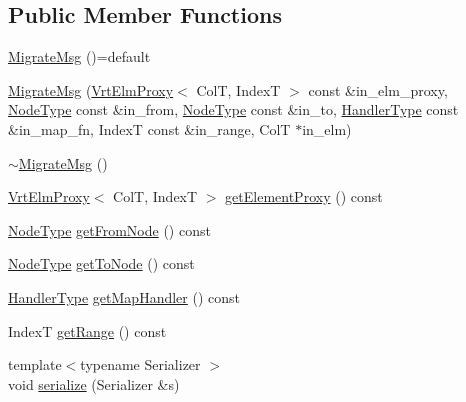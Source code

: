 \subsection*{Public Member Functions}
\begin{DoxyCompactItemize}
\item 
\hyperlink{structvt_1_1vrt_1_1collection_1_1_migrate_msg_a0b41c5d241e067dadb4648653f9909bc}{Migrate\+Msg} ()=default
\item 
\hyperlink{structvt_1_1vrt_1_1collection_1_1_migrate_msg_a900313445de89550eca07334a2ca21ba}{Migrate\+Msg} (\hyperlink{structvt_1_1vrt_1_1collection_1_1_vrt_elm_proxy}{Vrt\+Elm\+Proxy}$<$ ColT, IndexT $>$ const \&in\+\_\+elm\+\_\+proxy, \hyperlink{namespacevt_a866da9d0efc19c0a1ce79e9e492f47e2}{Node\+Type} const \&in\+\_\+from, \hyperlink{namespacevt_a866da9d0efc19c0a1ce79e9e492f47e2}{Node\+Type} const \&in\+\_\+to, \hyperlink{namespacevt_af64846b57dfcaf104da3ef6967917573}{Handler\+Type} const \&in\+\_\+map\+\_\+fn, IndexT const \&in\+\_\+range, ColT $\ast$in\+\_\+elm)
\item 
\hyperlink{structvt_1_1vrt_1_1collection_1_1_migrate_msg_a67874e771516da55d7509353dfa3a249}{$\sim$\+Migrate\+Msg} ()
\item 
\hyperlink{structvt_1_1vrt_1_1collection_1_1_vrt_elm_proxy}{Vrt\+Elm\+Proxy}$<$ ColT, IndexT $>$ \hyperlink{structvt_1_1vrt_1_1collection_1_1_migrate_msg_a6a8d4f819ebe556df1f3533bfa0e21f2}{get\+Element\+Proxy} () const
\item 
\hyperlink{namespacevt_a866da9d0efc19c0a1ce79e9e492f47e2}{Node\+Type} \hyperlink{structvt_1_1vrt_1_1collection_1_1_migrate_msg_ab3b156dd31382eab3551024ee3668fad}{get\+From\+Node} () const
\item 
\hyperlink{namespacevt_a866da9d0efc19c0a1ce79e9e492f47e2}{Node\+Type} \hyperlink{structvt_1_1vrt_1_1collection_1_1_migrate_msg_a24d93f9c73876f57d51a83f53a6e6796}{get\+To\+Node} () const
\item 
\hyperlink{namespacevt_af64846b57dfcaf104da3ef6967917573}{Handler\+Type} \hyperlink{structvt_1_1vrt_1_1collection_1_1_migrate_msg_a53385ade125d280d5621f1b5cdbffa78}{get\+Map\+Handler} () const
\item 
IndexT \hyperlink{structvt_1_1vrt_1_1collection_1_1_migrate_msg_a248315e475abddd6d6b0d0213d6c2dab}{get\+Range} () const
\item 
{\footnotesize template$<$typename Serializer $>$ }\\void \hyperlink{structvt_1_1vrt_1_1collection_1_1_migrate_msg_afd275449bca23638c2d8139fff35d39f}{serialize} (Serializer \&s)
\end{DoxyCompactItemize}
